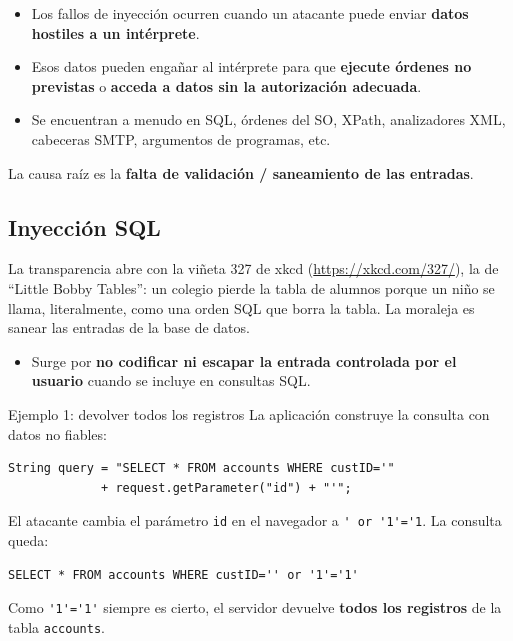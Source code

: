 \documentclass[11pt,a4paper]{report}
\begin{document}
\begin{itemize}
  \item Los fallos de inyección ocurren cuando un atacante puede enviar \textbf{datos hostiles a un intérprete}.
  \item Esos datos pueden engañar al intérprete para que \textbf{ejecute órdenes no previstas} o \textbf{acceda a datos sin la autorización adecuada}.
  \item Se encuentran a menudo en SQL, órdenes del SO, XPath, analizadores XML, cabeceras SMTP, argumentos de programas, etc.
\end{itemize}
 
\begin{importante}
La causa raíz es la \textbf{falta de validación / saneamiento de las entradas}.
\end{importante}
 
\subsection{Inyección SQL}
 
La transparencia abre con la viñeta 327 de xkcd (\url{https://xkcd.com/327/}), la de ``Little Bobby Tables'': un colegio pierde la tabla de alumnos porque un niño se llama, literalmente, como una orden SQL que borra la tabla. La moraleja es sanear las entradas de la base de datos.
 
\begin{itemize}
  \item Surge por \textbf{no codificar ni escapar la entrada controlada por el usuario} cuando se incluye en consultas SQL.
\end{itemize}
 
\begin{ejemplo}{Ejemplo 1: devolver todos los registros}
La aplicación construye la consulta con datos no fiables:
\begin{verbatim}
String query = "SELECT * FROM accounts WHERE custID='"
             + request.getParameter("id") + "'";
\end{verbatim}
El atacante cambia el parámetro \texttt{id} en el navegador a \verb|' or '1'='1|. La consulta queda:
\begin{verbatim}
SELECT * FROM accounts WHERE custID='' or '1'='1'
\end{verbatim}
Como \verb|'1'='1'| siempre es cierto, el servidor devuelve \textbf{todos los registros} de la tabla \texttt{accounts}.
\end{ejemplo}
 
\end{document}
